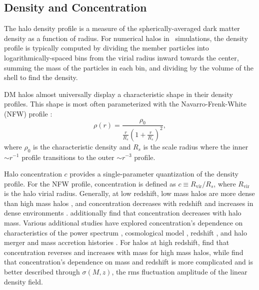 \subsection{Density and Concentration}
\label{subsec:early_universe--dark_matter_halos--density}


The halo density profile is a measure of the spherically-averaged dark matter density as a function of radius.  For numerical halos in \nbody\ simulations, the density profile is typically computed by dividing the member particles into logarithmically-spaced bins from the virial radius inward towards the center, summing the mass of the particles in each bin, and dividing by the volume of the shell to find the density.

DM halos almost universally display a characteristic shape in their density profiles.  This shape is most often parameterized with the Navarro-Frenk-White (NFW) profile \citep{1996ApJ...462..563N}:
\begin{equation} \label{eq:nfw_profile}
	\rho(r) = \frac{ \rho_{0} }{ \frac{ r }{ R_{s}} \left( 1 + \frac{r}{R_{s}} \right)^{2} },
\end{equation}
where $\rho_{0}$ is the characteristic density and $R_{s}$ is the scale radius where the inner $\sim r^{-1}$ profile transitions to the outer $\sim r^{-3}$ profile.


Halo concentration $c$ provides a single-parameter quantization of the density profile.  For the NFW profile, concentration is defined as $c \equiv R_{\mathrm{vir}} / R_{s}$, where $R_{\mathrm{vir}}$ is the halo virial radius.  Generally, at low redshift, low mass halos are more dense than high mass halos \citep{1997ApJ...490..493N}, and concentration decreases with redshift and increases in dense environments \citep{2001MNRAS.321..559B}.  \citet{2007MNRAS.381.1450N} additionally find that concentration decreases with halo mass.  Various additional studies have explored concentration's dependence on characteristics of the power spectrum \citep{2001ApJ...554..114E}, cosmological model \citep{2008MNRAS.391.1940M}, redshift \citep{2008MNRAS.387..536G, 2011MNRAS.411..584M}, and halo merger and mass accretion histories \citep{2002ApJ...568...52W, 2003MNRAS.339...12Z, 2009ApJ...707..354Z}.  For halos at high redshift, \citet{2011ApJ...740..102K} find that concentration reverses and increases with mass for high mass halos, while \citet{2012MNRAS.423.3018P} find that concentration's dependence on mass and redshift is more complicated and is better described through $\sigma(M,z)$, the rms fluctuation amplitude of the linear density field.

